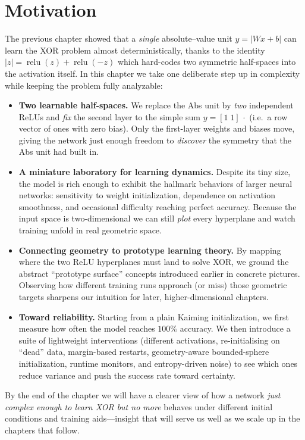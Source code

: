 \section{Motivation}
\label{sec:relu1-motivation}

The previous chapter showed that a \emph{single} absolute--value unit
\(
  y=\lvert W x + b\rvert
\)
can learn the XOR problem almost deterministically, thanks to the
identity
\(
  \lvert z\rvert=\operatorname{relu}(z)+\operatorname{relu}(-z)
\)
which hard-codes two symmetric half-spaces into the activation itself.
In this chapter we take one deliberate step up in complexity while
keeping the problem fully analyzable:

\begin{itemize}
  \item \textbf{Two learnable half-spaces.}
        We replace the Abs unit by \emph{two} independent ReLUs and \emph{fix} the second layer to the simple sum \(y=[1\;1]\,\cdot\) (i.e.\ a row vector of ones with zero bias). Only the first-layer weights and biases move, giving the network just enough freedom to \emph{discover} the symmetry that the Abs unit had built in.
  \item \textbf{A miniature laboratory for learning dynamics.}
        Despite its tiny size, the model is rich enough to exhibit the hallmark behaviors of larger neural networks: sensitivity to weight initialization, dependence on activation smoothness, and occasional difficulty reaching perfect accuracy. Because the input space is two-dimensional we can still \emph{plot} every hyperplane and watch training unfold in real geometric space.
  \item \textbf{Connecting geometry to prototype learning theory.}
        By mapping where the two ReLU hyperplanes must land to solve XOR, we ground the abstract ``prototype surface'' concepts introduced earlier in concrete pictures. Observing how different training runs approach (or miss) those geometric targets sharpens our intuition for later, higher-dimensional chapters.
  \item \textbf{Toward reliability.}
        Starting from a plain Kaiming initialization, we first measure how often the model reaches $100\%$ accuracy. We then introduce a suite of lightweight interventions (different activations, re-initialising on ``dead'' data, margin-based restarts, geometry-aware bounded-sphere initialization, runtime monitors, and entropy-driven noise) to see which ones reduce variance and push the success rate toward certainty.
\end{itemize}

By the end of the chapter we will have a clearer view of how a network \emph{just complex enough to learn XOR but no more} behaves under different initial conditions and training aids---insight that will serve us well as we scale up in the chapters that follow.
